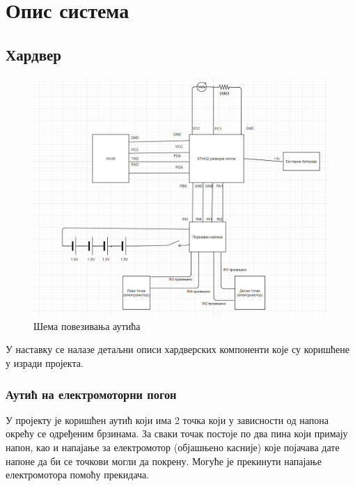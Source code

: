 \chapter{Опис система}
\section{Хардвер} \label{sec:hardware}
	\begin{figure}[htb!]
		\begin{center}
			\includegraphics[scale=0.6]{pictures/Schema}
			\caption{Шема повезивања аутића}\label{fig:Schema}
		\end{center}
	\end{figure}

У наставку се налазе детаљни описи хардверских компоненти које су коришћене у изради пројекта. 

\subsection{Аутић на електромоторни погон}
У пројекту је коришћен аутић који има 2 точка који у зависности од напона окрећу се одређеним брзинама. За сваки точак постоје по два пина који примају напон, као и напајање за електромотор (објашњено касније) које појачава дате напоне да би се точкови могли да покрену. Могуће је прекинути напајање електромотора помоћу прекидача.

